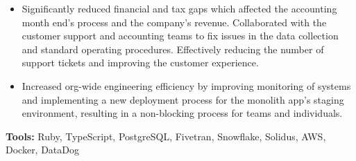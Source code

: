 \documentclass[paper=a4,fontsize=11pt]{scrartcl} %
\newcommand{\sepspace}{\vspace*{1em}}     %
\begin{document}
{\begin{itemize}
    \item Significantly reduced financial and tax gaps which affected the accounting month end's
          process and the company's revenue. Collaborated with the customer support and accounting
          teams to fix issues in the data collection and standard operating procedures. Effectively
          reducing the number of support tickets and improving the customer experience.
    \item Increased org-wide engineering efficiency by improving monitoring of systems
          and implementing a new deployment process for the monolith app's staging environment,
          resulting in a non-blocking process for teams and individuals.
  \end{itemize}
  \textbf{Tools:} Ruby, TypeScript, PostgreSQL, Fivetran, Snowflake, Solidus, AWS, Docker, DataDog
}
\sepspace
\end{document}

